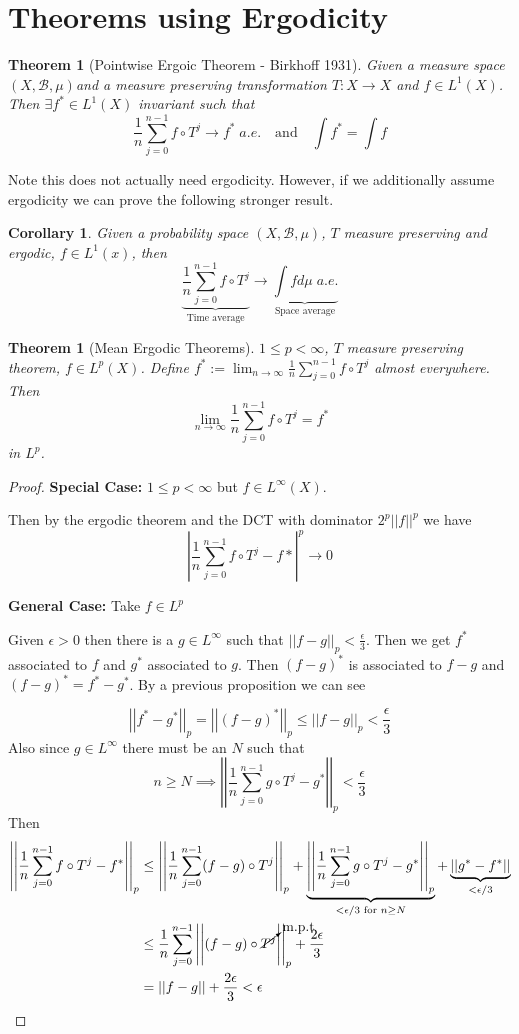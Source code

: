 \documentclass[11pt]{article}
\newcommand{\defeq}{:=}
\newcommand{\abs}[1]{\left|#1\right|}
\newcommand{\norm}[1]{\left|\left|#1\right|\right|}
\newcommand{\msrspc}{\ensuremath{(X,\mathcal{B},\mu)}}
\newtheorem{theorem}[prop]{Theorem}
\newtheorem{cor}[prop]{Corollary}
\begin{document}
\section{Theorems using Ergodicity}
\begin{theorem}[Pointwise Ergoic Theorem - Birkhoff 1931]
	Given a measure space \msrspc and a measure preserving transformation $T:X \to X$ and $f\in L^1(X)$. Then $\exists f^*\in L^1(X)$ invariant such that
	$$\frac{1}{n}\sum_{j=0}^{n-1}f\circ T^j \to f^* \; a.e.\quad \text{and} \quad \int f^* = \int f$$
\end{theorem}
Note this does not actually need ergodicity. However, if we additionally assume ergodicity we can prove the following stronger result.
\begin{cor}
Given a probability space \msrspc, $T$ measure preserving and ergodic, $f\in L^1(x)$, then
$$\underbrace{\frac{1}{n}\sum_{j=0}^{n-1}f\circ T^j }_{\text{Time average}}\to \underbrace{\int f d\mu \; a.e.}_{\text{Space average}}$$
\end{cor}
\begin{theorem}[Mean Ergodic Theorems]
	$1\leq p < \infty$, $T$ measure preserving theorem, $f\in L^p(X)$. Define $f^*\defeq \lim_{n\to\infty} \frac{1}{n}\sum_{j=0}^{n-1}f\circ T^j$ almost everywhere. Then
	$$\lim_{n\to\infty}\frac{1}{n}\sum_{j=0}^{n-1}f\circ T^j = f^*$$
	in $L^p$.
\end{theorem}

\begin{proof}
\textbf{Special Case: }$1\leq p < \infty$ but $f\in L^\infty(X)$.

Then by the ergodic theorem and the DCT with dominator $2^p\norm{f}^p$ we have
\[
	\abs{\frac{1}{n}\sum_{j=0}^{n-1}f\circ T^j - f*}^p \to 0
\]

\textbf{General Case: }Take $f\in L^p$

Given $\epsilon >0$ then there is a $g\in L^\infty$ such that $\norm{f-g}_p < \frac{\epsilon}{3}$.
Then we get $f^\ast$ associated to $f$ and $g^\ast$ associated to $g$.
Then $(f-g)^\ast$ is associated to $f-g$ and $(f-g)^\ast=f^\ast - g^\ast$.
By a previous proposition we can see

\[
	\norm{f^\ast-g^\ast}_p = \norm{(f-g)^\ast}_p \leq \norm{f-g}_p < \frac{\epsilon}{3}
\]
Also since $g\in L^\infty$ there must be an $N$ such that
\[
	n\geq N \implies \norm{\frac{1}{n}\sum_{j=0}^{n-1}g\circ T^j - g^\ast}_p < \frac{\epsilon}{3}
\]
Then
\begin{align*}
	\norm{\frac{1}{n}\sum_{j=0}^{n-1}f\circ T^j - f^\ast}_p & \leq \norm{\frac{1}{n}\sum_{j=0}^{n-1}(f-g)\circ T^j}_p +  \underbrace{\norm{\frac{1}{n}\sum_{j=0}^{n-1}g\circ T^j - g^\ast}_p}_{<\epsilon/3 \text{ for }n\geq N} + \underbrace{\norm{g^\ast - f^\ast}}_{<\epsilon/3} \\
															& \leq \frac{1}{n}\sum_{j=0}^{n-1}\norm{(f-g)\circ \cancelto{\text{m.p.t}}{T^j}}_p + \frac{2\epsilon}{3}\\
															& = \norm{f-g} + \frac{2\epsilon}{3} < \epsilon
\end{align*}
\end{proof}
\end{document}
